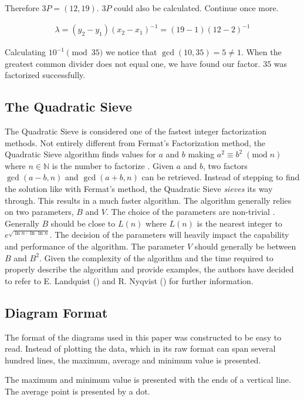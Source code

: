 Therefore $3P = (12, 19)$. $3P$ could also be calculated. Continue once more.

\begin{equation*}
    \begin{array}{l}
        \lambda = (y_2 - y_1)(x_2 - x_1)^{-1} = (19-1)(12-2)^{-1}
    \end{array}
\end{equation*}

Calculating $10^{-1}\pmod{35}$ we notice that $\gcd(10,35)=5\neq1$. When the greatest common divider does not equal one, we have found our factor. $35$ was factorized successfully.

\subsection{The Quadratic Sieve}

The Quadratic Sieve is considered one of the fastest integer factorization methods. Not entirely different from Fermat's Factorization method, the Quadratic Sieve algorithm finds values for $a$ and $b$ making $a^2\equiv b^2\;(\text{mod}\;n)$ where $n\in\mathbb{N}$ is the number to factorize \cite{quadraticSieve}. Given $a$ and $b$, two factors $\gcd(a-b, n)$ and $\gcd(a+b, n)$ can be retrieved. Instead of stepping to find the solution like with Fermat's method, the Quadratic Sieve \textit{sieves} its way through. This results in a much faster algorithm. The algorithm generally relies on two parameters, $B$ and $V$. The choice of the parameters are non-trivial \cite{Cryptography101}. Generally $B$ should be close to $L(n)$ where $L(n)$ is the nearest integer to $e^{\sqrt{\ln{n}\cdot\ln{\ln{n}}}}$. The decision of the parameters will heavily impact the capability and performance of the algorithm. The parameter $V$ should generally be between $B$ and $B^2$. Given the complexity of the algorithm and the time required to properly describe the algorithm and provide examples, the authors have decided to refer to E. Landquist (\cite{quadraticSieve}) and R. Nyqvist (\cite{Cryptography101}) for further information.

\subsection{Diagram Format}
The format of the diagrams used in this paper was constructed to be easy to read. Instead of plotting the data, which in its raw format can span several hundred lines, the maximum, average and minimum value is presented.
\begin{figure}[H]
    \centering
    
\end{figure}
The maximum and minimum value is presented with the ends of a vertical line. The average point is presented by a dot.

